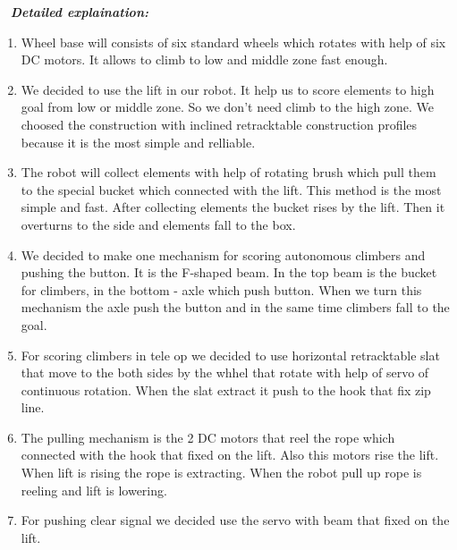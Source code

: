  \newline
\textit{\textbf{Detailed explaination:}}
\begin{enumerate}
	\item Wheel base will consists of six standard wheels which rotates with help of six DC motors. It allows to climb to low and middle zone fast enough.
	
	\item We decided to use the lift in our robot. It help us to score elements to high goal from low or middle zone. So we don't need climb to the high zone. We choosed the construction with inclined retracktable construction profiles because it is the most simple and relliable.
	
	\item The robot will collect elements with help of rotating brush which pull them to the special bucket which connected with the lift. This method is the most simple and fast. After collecting elements the bucket rises by the lift. Then it overturns to the side and elements fall to the box.
	
	\item We decided to make one mechanism for scoring autonomous climbers and pushing the button. It is the F-shaped beam. In the top beam is the bucket for climbers, in the bottom - axle which push button. When we turn this mechanism the axle push the button and in the same time climbers fall to the goal.
	
	\item For scoring climbers in tele op we decided to use horizontal retracktable slat that move to the both sides by the whhel that rotate with help of servo of continuous rotation. When the slat extract it push to the hook that fix zip line.
	
	\item The pulling mechanism is the 2 DC motors that reel the rope which connected with the hook that fixed on the lift. Also this motors rise the lift. When lift is rising the rope is extracting. When the robot pull up rope is reeling and lift is lowering. 
	
	\item For pushing clear signal we decided use the servo with beam that fixed on the lift.

	
\end{enumerate}

 \newline

\fillpage
